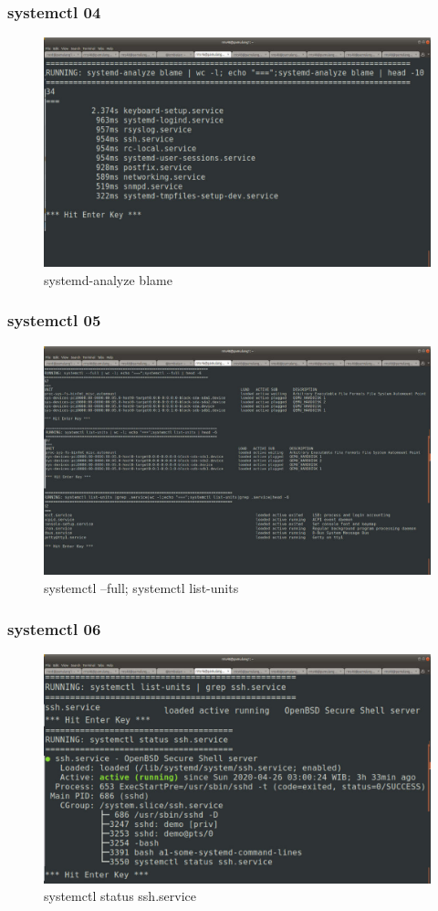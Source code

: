 \documentclass[aspectratio=169, xcolor=table, notheorems, hyperref={pdfpagelabels=false}]{beamer}
\begin{document}
\begin{frame}[fragile]
\frametitle{systemctl 04}
\begin{figure}
\includegraphics[width=.74\linewidth]{os-systemd03.jpg}
\caption{systemd-analyze blame}
\end{figure}
\end{frame}

\begin{frame}[fragile]
\frametitle{systemctl 05}
\begin{figure}
\includegraphics[width=.74\linewidth]{os-systemd04.jpg}
\caption{systemctl --full; systemctl list-units}
\end{figure}
\end{frame}

\begin{frame}[fragile]
\frametitle{systemctl 06}
\begin{figure}
\includegraphics[width=.74\linewidth]{os-systemd05.jpg}
\caption{systemctl status ssh.service}
\end{figure}
\end{frame}
\end{document}
